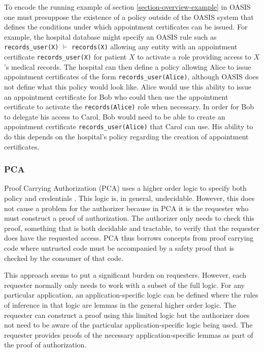 To encode the running example of section \autoref{section-overview-example}
in OASIS one must presuppose the existence of a policy outside of the OASIS
system that defines the conditions under which appointment certificates can
be issued. For example, the hospital database might specify an OASIS rule
such as \texttt{records\_user(X)} $\vdash$ \texttt{records(X)} allowing any
entity with an appointment certificate \texttt{records\_user(X)} for
patient $X$ to activate a role providing access to $X$'s medical records.
The hospital can then define a policy allowing Alice to issue appointment
certificates of the form \texttt{records\_user(Alice)}, although OASIS does
not define what this policy would look like. Alice would use this ability
to issue an appointment certificate for Bob who could then use the
appointment certificate to activate the \texttt{records(Alice)} role when
necessary. In order for Bob to delegate his access to Carol, Bob would need
to be able to create an appointment certificate
\texttt{records\_user(Alice)} that Carol can use. His ability to do this
depends on the hospital's policy regarding the creation of appointment
certificates.

\subsubsection{PCA}
\label{section-other-PCA}

Proof Carrying Authorization (PCA) uses a higher order logic to specify
both policy and credentials \cite{Appel:PCA,Bauer:GFACSW,Bauer:ACWPCA}.
This logic is, in general, undecidable. However, this does not cause a
problem for the authorizer because in PCA it is the requester who must
construct a
proof of authorization. The authorizer only needs to check this proof,
something that is both decidable and tractable, to verify that the
requester does have the requested access. PCA thus borrows concepts from
proof carrying code \cite{Necula:PCC} where untrusted code must be
accompanied by a safety proof that is checked by the consumer of that code.

This approach seems to put a significant burden on requesters. However,
each requester normally only needs to work with a subset of the full logic.
For any particular application, an application-specific logic can be
defined where the rules of inference in that logic are lemmas in the
general higher order logic. The requester can construct a proof using this
limited logic but the authorizer does not need to be aware of the
particular application-specific logic being used. The requester provides
proofs of the necessary application-specific lemmas as part of the proof of
authorization.

